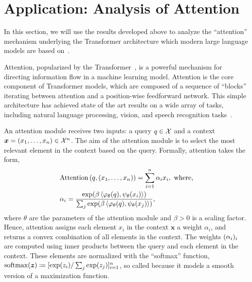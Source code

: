 \section{Application: Analysis of Attention}\label{sec:app_attention}

In this section, we will use the results developed above to analyze the ``attention'' mechanism underlying the Transformer architecture which modern large language models are based on~\parencite[e.g.,][]{chungScalingInstructionFinetunedLanguage2022,openaiGPT4TechnicalReport2023,touvronLlamaOpenFoundation2023,taoriAlpacaStrongReplicable2023}.

Attention, popularized by the Transformer~\parencite{vaswani2017attention}, is a powerful mechanism for directing information flow in a machine learning model. Attention is the core component of Transformer models, which are composed of a sequence of ``blocks'' iterating between attention and a position-wise feedforward network. This simple architecture has achieved state of the art results on a wide array of tasks, including natural language processing, vision, and speech recognition tasks~\parencite[e.g.,][]{devlinBertPretrainingDeep2018,dongSpeechtransformerNorecurrenceSequencetosequence2018,dosovitskiyImageWorth16x162020,raffelExploringLimitsTransfer2020,liuSwinTransformerHierarchical2021}.

An attention module receives two inputs: a query $q \in {\mathcal{X}}$ and a context $\bm{x} = (x_1, \ldots, x_n) \in {\mathcal{X}}^n$. The aim of the attention module is to select the most relevant element in the context based on the query. Formally, attention takes the form,
\begin{equation}\label{eq:def_attention}
    \begin{split}
        &\mathrm{Attention}\paren{q, (x_1, \ldots, x_n)} = \sum_{i=1}^n \alpha_i x_i, \ \text{where,} \\
        &\alpha_i = \frac{\exp(\beta \iprod{\phi_\theta(q)}{\psi_\theta(x_i)})}{\sum_j \exp(\beta \iprod{\phi_\theta(q)}{\psi_\theta(x_j)})},
    \end{split}
\end{equation}
where $\theta$ are the parameters of the attention module and $\beta > 0$ is a scaling factor. Hence, attention assigns each element $x_i$ in the context $\bm{x}$ a weight $\alpha_i$, and returns a convex combination of all elements in the context. The weights $(\alpha_i)_i$ are computed using inner products between the query and each element in the context. These elements are normalized with the ``softmax'' function, $\mathrm{softmax}(\bm{z}) \coloneq [\exp(z_i) / \sum_j \exp(z_j)]_{i=1}^{n}$, so called because it models a smooth version of a maximization function.

